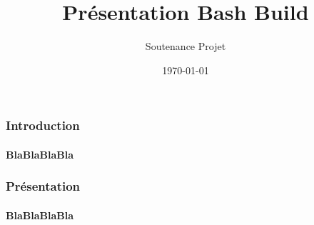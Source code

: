 \documentclass{beamer}
\begin{document}
\title{Présentation Bash Build}
\subtitle[\ldots]{Soutenance Projet}
\date{\today}
\maketitle

\begin{frame} %
\frametitle{Introduction}
\framesubtitle{BlaBlaBlaBla}

\end{frame}

\begin{frame} %
\frametitle{Présentation}
\framesubtitle{BlaBlaBlaBla}

\end{frame}
\end{document}
